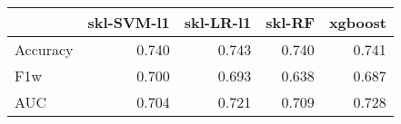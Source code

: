 \begin{tabular}{lrrrr}
\toprule
{} &  skl-SVM-l1 &  skl-LR-l1 &  skl-RF &  xgboost \\
\midrule
Accuracy &       0.740 &      0.743 &   0.740 &    0.741 \\
F1w      &       0.700 &      0.693 &   0.638 &    0.687 \\
AUC      &       0.704 &      0.721 &   0.709 &    0.728 \\
\bottomrule
\end{tabular}
